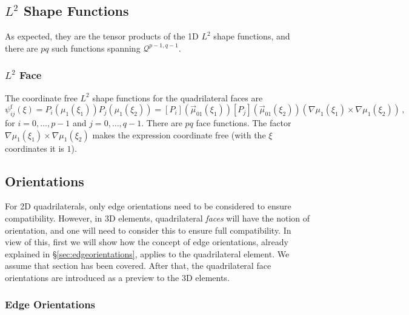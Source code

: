 \subsection{\texorpdfstring{$L^2$}{L2} Shape Functions}

As expected, they are the tensor products of the 1D $L^2$ shape functions, and there are $pq$ such functions spanning $\mathcal{Q}^{p-1,q-1}$.

\subsubsection{\texorpdfstring{$L^2$}{L2} Face}

The coordinate free $L^2$ shape functions for the quadrilateral faces are
\begin{equation}
    \psi_{ij}^\mathrm{f}(\xi)=P_i(\mu_1(\xi_1))P_j(\mu_1(\xi_2))
    	=[P_i](\vec{\mu}_{01}(\xi_1))[P_j](\vec{\mu}_{01}(\xi_2))(\nabla\mu_1(\xi_1)\!\!\times\!\!\nabla\mu_1(\xi_2))\,,
   \label{eq:QuadL2Functions}
\end{equation}
for $i=0,\ldots,p-1$ and $j=0,\ldots,q-1$. There are $pq$ face functions. 
The factor $\nabla\mu_1(\xi_1)\!\times\!\nabla\mu_1(\xi_2)$ makes the expression coordinate free (with the $\xi$ coordinates it is $1$).

\subsection{Orientations}
\label{sec:QuadOrientations}

For 2D quadrilaterals, only edge orientations need to be considered to ensure compatibility.
However, in 3D elements, quadrilateral \textit{faces} will have the notion of orientation, and one will need to consider this to ensure full compatibility.
In view of this, first we will show how the concept of edge orientations, already explained in \S\ref{sec:edgeorientations}, applies to the quadrilateral element. We assume that section has been covered.
After that, the quadrilateral face orientations are introduced as a preview to the 3D elements.

\subsubsection{Edge Orientations}
\label{sec:QuadEdgeOrientations}

